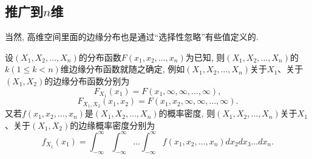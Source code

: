 \subsection{推广到$n$维}

当然, 高维空间里面的边缘分布也是通过``选择性忽略''有些值定义的. 

\begin{definition}
  设$(X_1,X_2,\dots,X_n)$的分布函数$F(x_1,x_2,\dots,x_n)$为已知, 则$(X_1,X_2,\dots,X_n)$的$k(1 \leq k < n )$维边缘分布函数就随之确定, 例如$(X_1,X_2,\dots,X_n)$关于$X_1$、关于$(X_1,X_2)$的边缘分布函数分别为
    \[F_{X_1}(x_1) = F(x_1,\infty,\infty,\dots,\infty),\]
    \[F_{X_1,X_2}(x_1,x_2) = F(x_1,x_2,\infty,\infty,\dots,\infty).\]
又若$f(x_1,x_2,\dots,x_n)$是$(X_1,X_2,\dots,X_n)$的概率密度, 则$(X_1,X_2,\dots,X_n)$关于$X_1$、关于$(X_1,X_2)$的边缘概率密度分别为
    \[f_{X_1}(x_1) = \int_{-\infty}^{\infty}\int_{-\infty}^{\infty}
    \dots \int_{-\infty}^{\infty}f(x_1,x_2,\dots,x_n)d{x_2}d{x_3}\dots d{x_n}.\]
\end{definition}